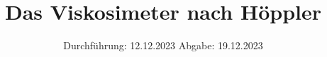 

\subject{v207}
\title{Das Viskosimeter nach Höppler}
\date{%
  Durchführung: 12.12.2023
  \hspace{3em}
  Abgabe: 19.12.2023
}



\maketitle
\thispagestyle{empty}
\tableofcontents
\newpage






\printbibliography{}

